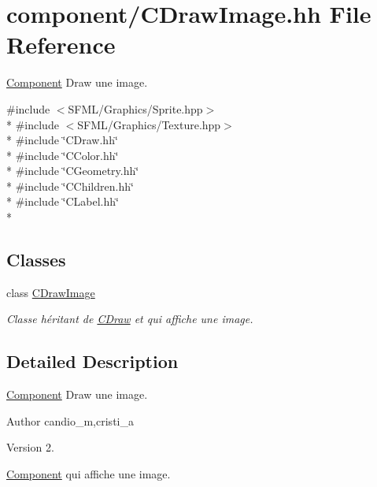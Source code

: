 \hypertarget{_c_draw_image_8hh}{}\section{component/\+C\+Draw\+Image.hh File Reference}
\label{_c_draw_image_8hh}


\hyperlink{class_component}{Component} Draw une image.  


{\ttfamily \#include $<$S\+F\+M\+L/\+Graphics/\+Sprite.\+hpp$>$}\\*
{\ttfamily \#include $<$S\+F\+M\+L/\+Graphics/\+Texture.\+hpp$>$}\\*
{\ttfamily \#include \char`\"{}C\+Draw.\+hh\char`\"{}}\\*
{\ttfamily \#include \char`\"{}C\+Color.\+hh\char`\"{}}\\*
{\ttfamily \#include \char`\"{}C\+Geometry.\+hh\char`\"{}}\\*
{\ttfamily \#include \char`\"{}C\+Children.\+hh\char`\"{}}\\*
{\ttfamily \#include \char`\"{}C\+Label.\+hh\char`\"{}}\\*
\subsection*{Classes}
\begin{DoxyCompactItemize}
\item 
class \hyperlink{class_c_draw_image}{C\+Draw\+Image}
\begin{DoxyCompactList}\small\item\em Classe héritant de \hyperlink{class_c_draw}{C\+Draw} et qui affiche une image. \end{DoxyCompactList}\end{DoxyCompactItemize}


\subsection{Detailed Description}
\hyperlink{class_component}{Component} Draw une image. 

\begin{DoxyAuthor}{Author}
candio\+\_\+m,cristi\+\_\+a 
\end{DoxyAuthor}
\begin{DoxyVersion}{Version}
2.
\end{DoxyVersion}
\hyperlink{class_component}{Component} qui affiche une image. 